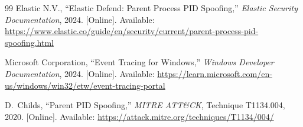 \documentclass[10pt,twocolumn,letterpaper]{article}
\begin{document}
\begin{thebibliography}{99}
Elastic N.V.,
``Elastic Defend: Parent Process PID Spoofing,''
\emph{Elastic Security Documentation}, 2024.
[Online]. Available: \url{https://www.elastic.co/guide/en/security/current/parent-process-pid-spoofing.html}

Microsoft Corporation,
``Event Tracing for Windows,''
\emph{Windows Developer Documentation}, 2024.
[Online]. Available: \url{https://learn.microsoft.com/en-us/windows/win32/etw/event-tracing-portal}

D.~Childs,
``Parent PID Spoofing,''
\emph{MITRE ATT\&CK}, Technique T1134.004, 2020.
[Online]. Available: \url{https://attack.mitre.org/techniques/T1134/004/}

\end{thebibliography}
\end{document}
